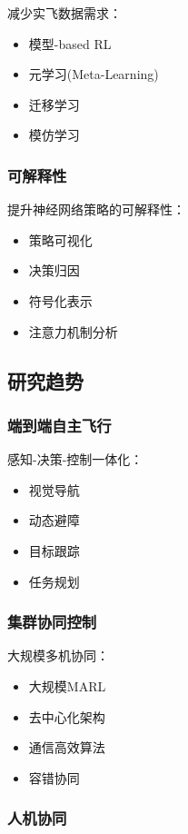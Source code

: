 \documentclass[12pt,a4paper]{ctexart}
\begin{document}
减少实飞数据需求：
\begin{itemize}
    \item 模型-based RL
    \item 元学习(Meta-Learning)
    \item 迁移学习
    \item 模仿学习
\end{itemize}

\subsubsection{可解释性}

提升神经网络策略的可解释性：
\begin{itemize}
    \item 策略可视化
    \item 决策归因
    \item 符号化表示
    \item 注意力机制分析
\end{itemize}

\subsection{研究趋势}

\subsubsection{端到端自主飞行}

感知-决策-控制一体化：
\begin{itemize}
    \item 视觉导航
    \item 动态避障
    \item 目标跟踪
    \item 任务规划
\end{itemize}

\subsubsection{集群协同控制}

大规模多机协同：
\begin{itemize}
    \item 大规模MARL
    \item 去中心化架构
    \item 通信高效算法
    \item 容错协同
\end{itemize}

\subsubsection{人机协同}
\end{document}
